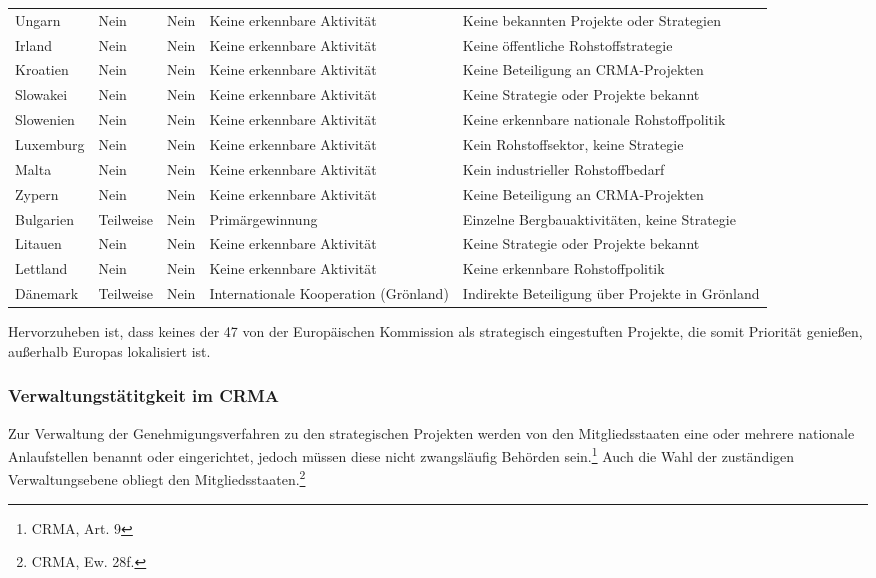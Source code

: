 \documentclass[12pt,a4paper,oneside]{book} %
\begin{document}
\begin{table}[htbp]
\begin{tabular}{|p{3cm}|p{2.5cm}|p{2.5cm}|p{4cm}|p{6cm}|}
		Ungarn & Nein & Nein & Keine erkennbare Aktivität & Keine bekannten Projekte oder Strategien \\
		Irland & Nein & Nein & Keine erkennbare Aktivität & Keine öffentliche Rohstoffstrategie \\
		Kroatien & Nein & Nein & Keine erkennbare Aktivität & Keine Beteiligung an CRMA-Projekten \\
		Slowakei & Nein & Nein & Keine erkennbare Aktivität & Keine Strategie oder Projekte bekannt \\
		Slowenien & Nein & Nein & Keine erkennbare Aktivität & Keine erkennbare nationale Rohstoffpolitik \\
		Luxemburg & Nein & Nein & Keine erkennbare Aktivität & Kein Rohstoffsektor, keine Strategie \\
		Malta & Nein & Nein & Keine erkennbare Aktivität & Kein industrieller Rohstoffbedarf \\
		Zypern & Nein & Nein & Keine erkennbare Aktivität & Keine Beteiligung an CRMA-Projekten \\
		Bulgarien & Teilweise & Nein & Primärgewinnung & Einzelne Bergbauaktivitäten, keine Strategie \\
		Litauen & Nein & Nein & Keine erkennbare Aktivität & Keine Strategie oder Projekte bekannt \\
		Lettland & Nein & Nein & Keine erkennbare Aktivität & Keine erkennbare Rohstoffpolitik \\
		Dänemark & Teilweise & Nein & Internationale Kooperation (Grönland) & Indirekte Beteiligung über Projekte in Grönland \\
		\hline
	\end{tabular}
	\label{tab:crma_umsetzung}
\end{table}


Hervorzuheben ist, dass keines der 47 von der Europäischen Kommission als strategisch eingestuften Projekte, die somit Priorität genießen, außerhalb Europas lokalisiert ist.

\subsubsection{Verwaltungstätitgkeit im CRMA}

Zur Verwaltung der Genehmigungsverfahren zu den strategischen Projekten werden von den Mitgliedsstaaten eine oder mehrere nationale Anlaufstellen benannt oder eingerichtet, jedoch müssen diese nicht zwangsläufig Behörden sein.\footnote{CRMA, Art. 9} Auch die Wahl der zuständigen Verwaltungsebene obliegt den Mitgliedsstaaten.\footnote{CRMA, Ew. 28f.}
\end{document}

